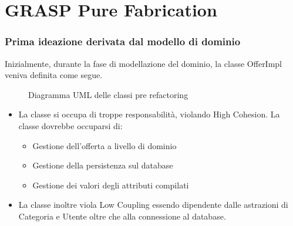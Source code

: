 \section{GRASP Pure Fabrication}

\begin{frame}
    \frametitle{Prima ideazione derivata dal modello di dominio}
    Inizialmente, durante la fase di modellazione del dominio, la classe OfferImpl veniva definita come segue.

    \begin{minipage}{.29\textwidth}
        \begin{figure}
            \centering
            \caption{Diagramma UML delle classi pre refactoring}
        \end{figure}
    \end{minipage}
    \begin{minipage}{.68\textwidth}
        \begin{itemize}
            \item<1-> La classe si occupa di troppe responsabilità, violando High Cohesion. La classe dovrebbe occuparsi di:
            \begin{itemize}
                \item Gestione dell'offerta a livello di dominio
                \item Gestione della persistenza sul database
                \item Gestione dei valori degli attributi compilati
            \end{itemize}
            \item<2-> La classe inoltre viola Low Coupling essendo dipendente dalle astrazioni di Categoria e Utente oltre che alla connessione al database.
        \end{itemize}
    \end{minipage}
\end{frame}
